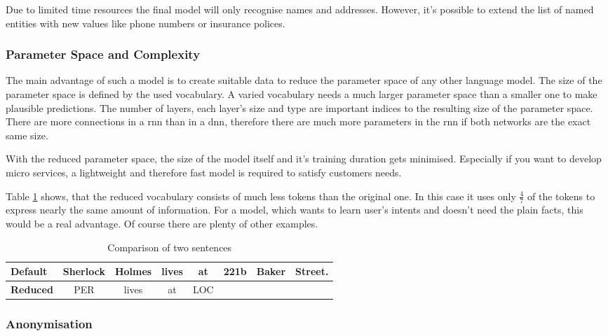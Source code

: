 Due to limited time resources the final model will only recognise names and addresses. However, it's possible to extend the list
of named entities with new values like phone numbers or insurance polices.

\subsubsection{Parameter Space and Complexity}

The main advantage of such a model is to create suitable data to reduce the parameter space of any other language model. The
size of the parameter space is defined by the used vocabulary. A varied vocabulary needs a much larger parameter space than
a smaller one to make plausible predictions. The number of layers, each layer's size and type are important indices to the
resulting size of the parameter space. There are more connections in a \acrshort{rnn} than in a \acrshort{dnn}, therefore
there are much more parameters in the \acrlong{rnn} if both networks are the exact same size.

With the reduced parameter space, the size of the model itself and it's training duration gets minimised. Especially if you want
to develop micro services, a lightweight and therefore fast model is required to satisfy customers needs.

Table \ref{tbl:param-space} shows, that the reduced vocabulary consists of much less tokens than the original one. In this
case it uses only $\frac{4}{7}$ of the tokens to express nearly the same amount of information. For a model, which wants to learn
user's intents and doesn't need the plain facts, this would be a real advantage. Of course there are plenty of other examples.

\begin{table}[h!]
    \centering
    \begin{tabular}{|l|c|c|c|c|c|c|c|}
        \hline
        \textbf{Default} & Sherlock & Holmes & lives & at & 221b & Baker & Street. \\
        \hline
        \textbf{Reduced} & PER & lives & at & LOC & & & \\
        \hline
    \end{tabular}
    \caption{Comparison of two sentences}
    \label{tbl:param-space}
\end{table}

\subsubsection{Anonymisation}


